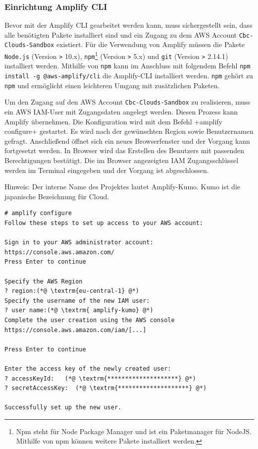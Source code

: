 \subsubsection{Einrichtung Amplify CLI}
\label{EinrichtungAmplify}
Bevor mit der Amplify CLI gearbeitet werden kann, muss sichergestellt sein, dass alle benötigten Pakete installiert sind und ein Zugang zu dem AWS Account \verb+Cbc-Clouds-Sandbox+ existiert.
Für die Verwendung von Amplify müssen die Pakete \verb+Node.js+ (Version \verb+>+ 10.x), \verb+npm+\footnote{Npm steht für Node Package Manager und ist ein Paketmanager für NodeJS. Mithilfe von npm können weitere Pakete installiert werden.} (Version \verb+>+ 5.x) und \verb+git+ (Version \verb+>+ 2.14.1) installiert werden.
Mithilfe von \verb+npm+ kann im Anschluss mit folgendem Befehl \verb+npm install -g @aws-amplify/cli+ die Amplify-CLI installiert werden.
\verb+npm+ gehört zu \verb+npm+ und ermöglicht einen leichteren Umgang mit zusätzlichen Paketen.

Um den Zugang auf den AWS Account \verb+Cbc-Clouds-Sandbox+ zu realisieren, muss ein AWS IAM-User mit Zugangsdaten angelegt werden.
Diesen Prozess kann Amplify übernehmen.
Die Konfiguration wird mit dem Befehl \spverb+amplify configure+ gestartet.
Es wird nach der gewünschten Region sowie Benutzernamen gefragt.
Anschließend öffnet sich ein neues Browserfenster und der Vorgang kann fortgesetzt werden.
In Browser wird das Erstellen des Benutzers mit passenden Berechtigungen bestätigt.
Die im Browser angezeigten IAM Zugangsschlüssel werden im Terminal eingegeben und der Vorgang ist abgeschlossen.\cite{ImpVoraus}
\newline


Hinweis: Der interne Name des Projektes lautet Amplify-Kumo.
Kumo ist die japanische Bezeichnung für \glqq Cloud\grqq.
\clearpage

\begin{lstlisting}[basicstyle=\ttfamily\small, breaklines=true , frame = single, backgroundcolor=\color{flashwhite} ]
# amplify configure
Follow these steps to set up access to your AWS account:

Sign in to your AWS administrator account:
https://console.aws.amazon.com/
Press Enter to continue

Specify the AWS Region
? region:(*@ \textrm{eu-central-1} @*)
Specify the username of the new IAM user:
? user name:(*@ \textrm{ amplify-kumo} @*)
Complete the user creation using the AWS console
https://console.aws.amazon.com/iam/[...]

Press Enter to continue

Enter the access key of the newly created user:
? accessKeyId:   (*@ \textrm{********************} @*)
? secretAccessKey:  (*@ \textrm{********************} @*)

Successfully set up the new user.
\end{lstlisting}


